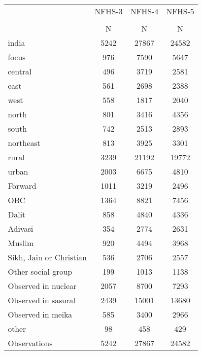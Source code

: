 {
\def\sym#1{\ifmmode^{#1}\else\(^{#1}\)\fi}
\begin{tabular}{l*{3}{c}}
\toprule
                    &      NFHS-3&      NFHS-4&      NFHS-5\\
                    &\multicolumn{1}{c}{}&\multicolumn{1}{c}{}&\multicolumn{1}{c}{}\\
                    &           N&           N&           N\\
\midrule
india               &        5242&       27867&       24582\\
focus               &         976&        7590&        5647\\
central             &         496&        3719&        2581\\
east                &         561&        2698&        2388\\
west                &         558&        1817&        2040\\
north               &         801&        3416&        4356\\
south               &         742&        2513&        2893\\
northeast           &         813&        3925&        3301\\
rural               &        3239&       21192&       19772\\
urban               &        2003&        6675&        4810\\
Forward             &        1011&        3219&        2496\\
OBC                 &        1364&        8821&        7456\\
Dalit               &         858&        4840&        4336\\
Adivasi             &         354&        2774&        2631\\
Muslim              &         920&        4494&        3968\\
Sikh, Jain or Christian&         536&        2706&        2557\\
Other social group  &         199&        1013&        1138\\
Observed in nuclear &        2057&        8700&        7293\\
Observed in sasural &        2439&       15001&       13680\\
Observed in meika   &         585&        3400&        2966\\
other               &          98&         458&         429\\
\midrule
Observations        &        5242&       27867&       24582\\
\bottomrule
\end{tabular}
}
